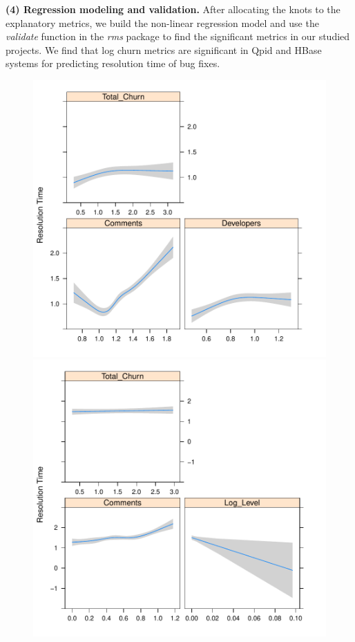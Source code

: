 \textbf{(4) Regression modeling and validation.} After allocating the knots to the explanatory metrics, we build the non-linear regression model and use the \textsl{validate} function in the \textsl{rms} package to find the significant metrics in our studied projects. We find that log churn metrics are significant in Qpid and HBase systems for predicting resolution time of bug fixes. 

\begin{figure}[t]
	\begin{minipage}{.5\columnwidth}
		\centering
		
		\includegraphics[width=.95\textwidth]{HadoopDirectionPlot}	
	\end{minipage}
		\begin{minipage}{.5\columnwidth}
			\centering
			
			\includegraphics[width=.95\textwidth]{QpidDirectionPlot}	
		\end{minipage}
			

\end{figure}
